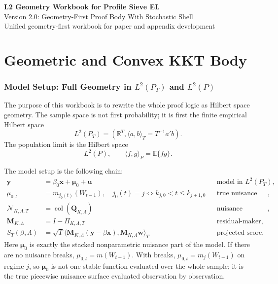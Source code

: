 \documentclass[12pt]{article}
\numberwithin{equation}{section}
\theoremstyle{definition}
\newcommand{\E}{\mathbb E}
\newcommand{\R}{\mathbb R}
\newcommand{\N}{\mathcal N}
\newcommand{\LtwoT}{L^2(P_T)}
\newcommand{\LtwoP}{L^2(P)}
\newcommand{\innerT}[2]{\langle #1,#2\rangle_T}
\newcommand{\innerP}[2]{\langle #1,#2\rangle_P}
\begin{document}
\begin{center}
{\Large\bf L2 Geometry Workbook for Profile Sieve EL}\\[6pt]
{\large Version 2.0: Geometry-First Proof Body With Stochastic Shell}\\[6pt]
{\normalsize Unified geometry-first workbook for paper and appendix development}\\[12pt]
\end{center}

\tableofcontents
\newpage

\part{Geometric and Convex KKT Body}

\section{Model Setup: Full Geometry in \texorpdfstring{\(L^2(P_T)\)}{L2PT} and \texorpdfstring{\(L^2(P)\)}{L2P}}

The purpose of this workbook is to rewrite the whole proof logic as Hilbert
space geometry. The sample space is not first probability; it is first the
finite empirical Hilbert space
\[
    \LtwoT=(\R^T,\innerT{a}{b}=T^{-1}a'b).
\]
The population limit is the Hilbert space
\[
    \LtwoP,\qquad \innerP{f}{g}=\E\{fg\}.
\]

The model setup is the following chain:
\[
\begin{aligned}
\bm y&=\beta_0\bm x+\bm\mu_0+\bm u
&&\text{model in }\LtwoT,\\
\mu_{0,t}&=m_{j_0(t)}(W_{t-1}),\quad
j_0(t)=j\iff k_{j,0}<t\le k_{j+1,0}
&&\text{true nuisance vector},\\
\N_{K,\Lambda,T}&=\operatorname{col}(\bm Q_{K,\Lambda})
&&\text{nuisance subspace},\\
\bm M_{K,\Lambda}&=I-\Pi_{K,\Lambda,T}
&&\text{residual-maker},\\
S_T(\beta,\Lambda)&=\sqrt T\innerT{\bm M_{K,\Lambda}(\bm y-\beta\bm x)}
{\bm M_{K,\Lambda}\bm w}
&&\text{projected score}.
\end{aligned}
\]
Here \(\bm\mu_0\) is exactly the stacked nonparametric nuisance part of the
model. If there are no nuisance breaks, \(\mu_{0,t}=m(W_{t-1})\). With breaks,
\(\mu_{0,t}=m_j(W_{t-1})\) on regime \(j\), so \(\bm\mu_0\) is not one stable
function evaluated over the whole sample; it is the true piecewise nuisance
surface evaluated observation by observation.
\end{document}
